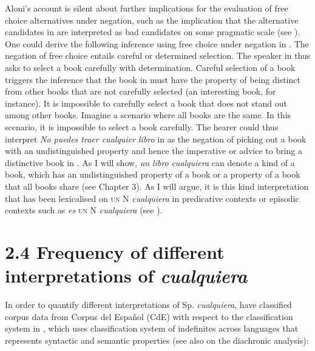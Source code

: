   Aloni’s account is silent about further implications for the evaluation of free choice alternatives under negation, such as the implication that the alternative candidates in  are interpreted as bad candidates on some pragmatic scale (see \citealt{Horn2000}). One could derive the following inference using free choice under negation in . The negation of free choice entails careful or determined selection. The speaker in  thus asks to select a book carefully with determination. Careful selection of a book triggers the inference that the book in  must have the property of being distinct from other books that are not carefully selected (an interesting book, for instance). It is impossible to carefully select a book that does not stand out among other books. Imagine a scenario where all books are the same. In this scenario, it is impossible to select a book carefully. The hearer could thus interpret \textit{No puedes traer cualquier libro} in  as the negation of picking out a book with an undistinguished property and hence the imperative or advice to bring a distinctive book in . As I will show, \textit{un libro} \textit{cualquiera} can denote a kind of a book, which has an undistinguished property of a book or a property of a book that all books share (see Chapter 3). As I will argue, it is this kind interpretation that has been lexicalised on \textsc{un} N \textit{cualquiera} in predicative contexts or episodic contexts such as \textit{es} \textsc{un} N \textit{cualquiera} (see ). 

\section{\textbf{2.4} \textbf{Frequency} \textbf{of} \textbf{different} \textbf{interpretations} \textbf{of} \textbf{\textit{cualquiera}}}

In order to quantify different interpretations of Sp. \textit{cualquiera}, \citet{AloniEtAl2010} have classified corpus data from Corpus del Español (CdE) with respect to the classification system in , which uses  classification system of indefinites across languages that represents syntactic and semantic properties (see also  on the diachronic analysis):


